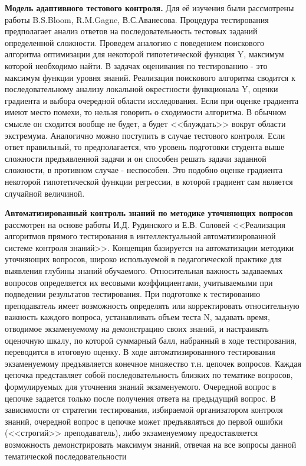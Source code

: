 \textbf{Модель адаптивного тестового контроля.} Для её изучения были рассмотрены работы B.S.Bloom, R.M.Gagne, В.С.Аванесова. Процедура тестирования предполагает анализ ответов на последовательность тестовых заданий определенной сложности. Проведем аналогию с поведением поискового алгоритма оптимизации для некоторой гипотетической функция Y, максимум которой необходимо найти. В задачах оценивания по тестированию - это максимум функции уровня знаний. Реализация поискового алгоритма сводится к последовательному анализу локальной окрестности функционала Y, оценки градиента и выбора очередной области исследования. Если при оценке градиента имеют место помехи, то нельзя говорить о сходимости алгоритма. В обычном смысле он сходится вообще не будет, а будет <<блуждать>> вокруг области экстремума. Аналогично можно поступить в случае тестового контроля. Если ответ правильный, то предполагается, что уровень подготовки студента выше сложности предъявленной задачи и он способен решать задачи заданной сложности, в противном случае - неспособен. Это подобно оценке градиента некоторой гипотетической функции регрессии, в которой градиент сам является случайной величиной. 

\textbf{Автоматизированный контроль знаний по методике уточняющих вопросов} рассмотрен на основе работы И.Д. Рудинского и Е.В. Соловей <<Реализация алгоритмов прямого тестирования в интеллектуальной автоматизированной системе контроля знаний>>. Концепция базируется на автоматизации методики уточняющих вопросов, широко используемой в педагогической практике для выявления глубины знаний обучаемого. Относительная важность задаваемых вопросов определяется их весовыми коэффициентами, учитываемыми при подведении результатов тестирования. При подготовке к тестированию преподаватель имеет возможность определять или корректировать относительную важность каждого вопроса, устанавливать объем теста N, задавать время, отводимое экзаменуемому на демонстрацию своих знаний, и настраивать оценочную шкалу, по которой суммарный балл, набранный в ходе тестирования, переводится в итоговую оценку. В ходе автоматизированного тестирования экзаменуемому предъявляется конечное множество т.н. цепочек вопросов. Каждая цепочка представляет собой последовательность близких по тематике вопросов, формулируемых для уточнения знаний экзаменуемого. Очередной вопрос в цепочке задается только после получения ответа на предыдущий вопрос. В зависимости от стратегии тестирования, избираемой организатором контроля знаний, очередной вопрос в цепочке может предъявляться до первой ошибки (<<строгий>> преподаватель), либо экзаменуемому предоставляется возможность демонстрировать максимум знаний, отвечая на все вопросы данной тематической последовательности

